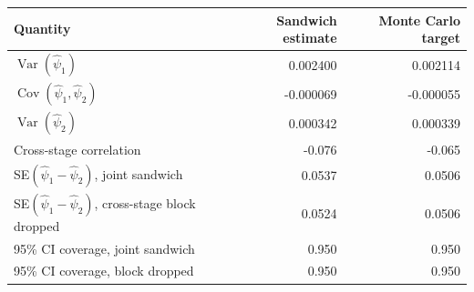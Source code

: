 \begin{tabular}{lrr}
\toprule
Quantity & Sandwich estimate & Monte Carlo target \\
\midrule
$\operatorname{Var}(\hat\psi_1)$ & 0.002400 & 0.002114 \\
$\operatorname{Cov}(\hat\psi_1,\hat\psi_2)$ & -0.000069 & -0.000055 \\
$\operatorname{Var}(\hat\psi_2)$ & 0.000342 & 0.000339 \\
Cross-stage correlation & -0.076 & -0.065 \\
\addlinespace
SE$(\hat\psi_1-\hat\psi_2)$, joint sandwich & 0.0537 & 0.0506 \\
SE$(\hat\psi_1-\hat\psi_2)$, cross-stage block dropped & 0.0524 & 0.0506 \\
95\% CI coverage, joint sandwich & 0.950 & 0.950 \\
95\% CI coverage, block dropped & 0.950 & 0.950 \\
\bottomrule
\end{tabular}
